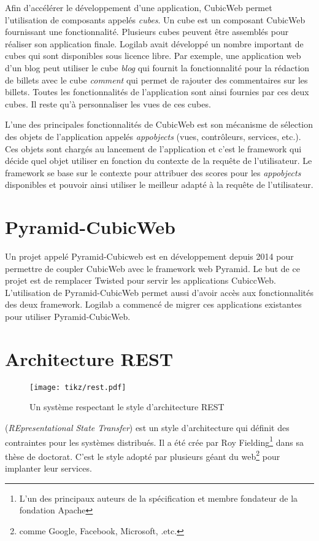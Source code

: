 Afin d'accélérer le développement d'une application, CubicWeb permet
l'utilisation de composants appelés \emph{cubes}. Un cube est un composant
CubicWeb fournissant une fonctionnalité. Plusieurs cubes peuvent être assemblés
pour réaliser son application finale. Logilab avait développé un nombre
important de cubes qui sont disponibles sous licence libre. Par exemple, une
application web d'un blog peut utiliser le cube \textit{blog} qui fournit la
fonctionnalité pour la rédaction de billets avec le cube \textit{comment} qui
permet de rajouter des commentaires sur les billets. Toutes les fonctionnalités
de l'application sont ainsi fournies par ces deux cubes. Il reste qu'à
personnaliser les vues de ces cubes.

L'une des principales fonctionnalités de CubicWeb est son mécanisme de
sélection des objets de l'application appelés \textit{appobjects} (vues,
contrôleurs, services, etc.). Ces objets sont chargés au lancement de
l'application et c'est le framework qui décide quel objet utiliser en fonction
du contexte de la requête de l'utilisateur. Le framework se base sur le
contexte pour attribuer des scores pour les \textit{appobjects} disponibles et
pouvoir ainsi utiliser le meilleur adapté à la requête de l'utilisateur.  

\section{Pyramid-CubicWeb} Un projet appelé Pyramid-Cubicweb est en
développement depuis 2014 pour permettre de coupler CubicWeb avec le framework
web Pyramid. Le but de ce projet est de remplacer Twisted pour servir les
applications CubiccWeb. L'utilisation de Pyramid-CubicWeb permet aussi d'avoir
accès aux fonctionnalités des deux framework. Logilab a commencé de migrer ces
applications existantes pour utiliser Pyramid-CubicWeb.
 
\section{Architecture REST} 
\begin{figure} 
    \centering
    \texttt{[image: tikz/rest.pdf]} 
    \caption{Un système respectant le style d'architecture REST} 
    \label{fig:rest} 
\end{figure}

 (\textit{REpresentational State Transfer}) est un style
d'architecture qui définit des contraintes pour les systèmes
 distribués. Il a été crée par Roy
Fielding\footnote{L’un des principaux auteurs de la spécification
 et membre fondateur de la fondation Apache} dans sa thèse
de doctorat\cite{restthesise}. C'est le style adopté par plusieurs géant du
web\footnote{comme Google, Facebook, Microsoft, .etc.} pour implanter leur
services. 


